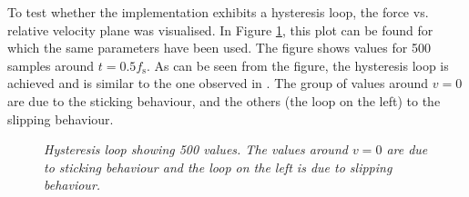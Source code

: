    To test whether the implementation exhibits a hysteresis loop, the force vs. relative velocity plane was visualised. In Figure \ref{fig:hysteresis}, this plot can be found for which the same parameters have been used. The figure shows values for 500 samples around $t = 0.5f_\text{s}$. As can be seen from the figure, the hysteresis loop is achieved and is similar to the one observed in \cite{Smith2000}. The group of values around $v=0$ are due to the sticking behaviour, and the others (the loop on the left) to the slipping behaviour.
    
    \begin{figure}[ht]
      \centering
      \caption{\it Hysteresis loop showing 500 values. The values around $v=0$ are due to sticking behaviour and the loop on the left is due to slipping behaviour. \label{fig:hysteresis}}
    \end{figure}
    

